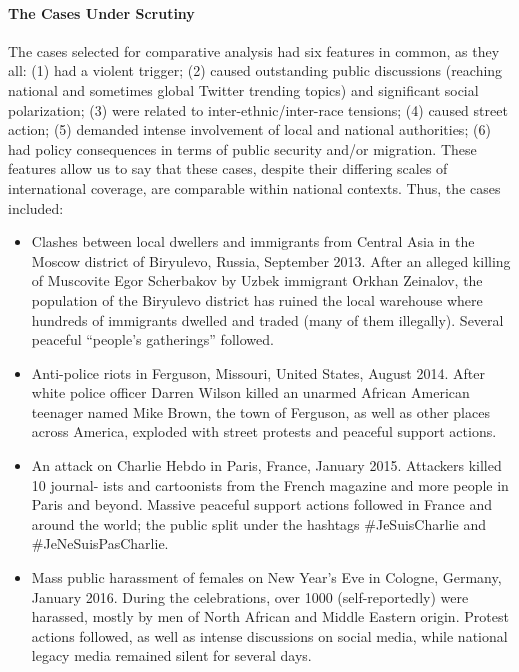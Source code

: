 \paragraph{The Cases Under Scrutiny}
The cases selected for comparative analysis had six features in common, as they all: (1) had a violent trigger; (2) caused outstanding public discussions (reaching national and sometimes global Twitter trending topics) and significant social polarization; (3) were related to inter-ethnic/inter-race tensions; (4) caused street action; (5) demanded intense involvement of local and national authorities; (6) had policy consequences in terms of public security and/or migration. These features allow us to say that these cases, despite their differing scales of international coverage, are comparable within national contexts. Thus, the cases included:
\begin{itemize}
	\item Clashes between local dwellers and immigrants from Central Asia in the Moscow district of Biryulevo, Russia, September 2013. After an alleged killing of Muscovite Egor Scherbakov by Uzbek immigrant Orkhan Zeinalov, the population of the Biryulevo district has ruined the local warehouse where hundreds of immigrants dwelled and traded (many of them illegally). Several peaceful “people’s gatherings” followed.
	
	\item Anti-police riots in Ferguson, Missouri, United States, August 2014. After white police officer Darren Wilson killed an unarmed African American teenager named Mike Brown, the town of Ferguson, as well as other places across America, exploded with street protests and peaceful support actions.
	
	\item An attack on Charlie Hebdo in Paris, France, January 2015. Attackers killed 10 journal- ists and cartoonists from the French magazine and more people in Paris and beyond. Massive peaceful support actions followed in France and around the world; the public split under the hashtags \#JeSuisCharlie and \#JeNeSuisPasCharlie.
	
	\item Mass public harassment of females on New Year’s Eve in Cologne, Germany, January 2016. During the celebrations, over 1000 (self-reportedly) were harassed, mostly by men of North African and Middle Eastern origin. Protest actions followed, as well as intense discussions on social media, while national legacy media remained silent for several days.
\end{itemize}

